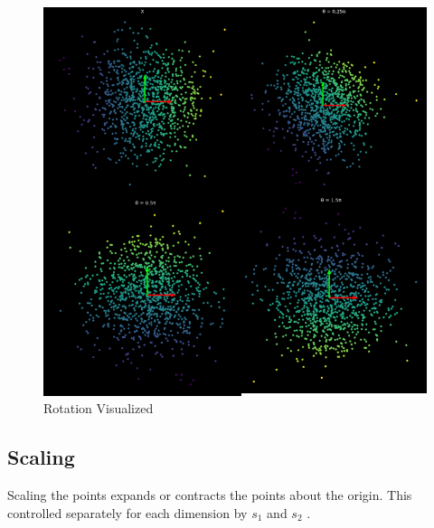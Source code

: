 \begin{figure}[h!]
\begin{center}
\includegraphics{labs/01/images/Rotation.png}
\end{center} 
\caption{Rotation Visualized}
\end{figure}


\subsection{Scaling}
Scaling the points expands or contracts the points about the origin. 
This controlled separately for each dimension by \(s_1\) and \(s_2\) .

